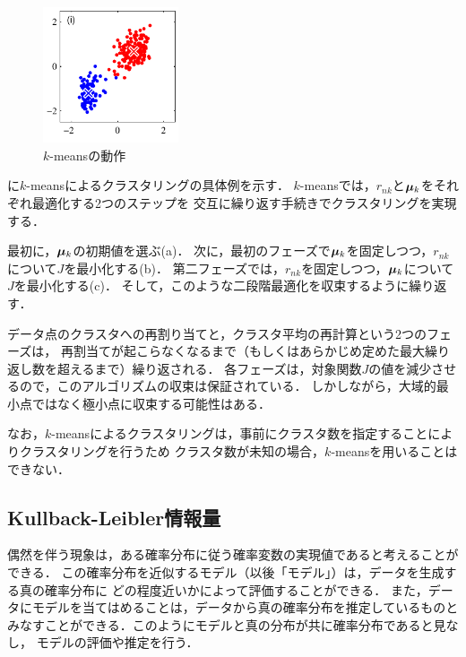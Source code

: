 \begin{figure}[htbp]
\begin{minipage}{0.33\hsize}
\begin{center}
    \end{center}
  \end{minipage}
  \begin{minipage}{0.33\hsize}
    \begin{center}
      \includegraphics[width=40mm]{img/kmeans/Figure91i.pdf}
    \end{center}
  \end{minipage}
  \caption{$k$-meansの動作}
  \label{fig:k-means}
\end{figure}

に$k$-meansによるクラスタリングの具体例を示す．
$k$-meansでは，$r_{nk}$と$\boldsymbol{\mu}_k$をそれぞれ最適化する2つのステップを
交互に繰り返す手続きでクラスタリングを実現する．

最初に，$\boldsymbol{\mu}_k$の初期値を選ぶ(a)．
次に，最初のフェーズで$\boldsymbol{\mu}_k$を固定しつつ，$r_{nk}$について$J$を最小化する(b)．
第二フェーズでは，$r_{nk}$を固定しつつ，$\boldsymbol{\mu}_k$について$J$を最小化する(c)．
そして，このような二段階最適化を収束するように繰り返す．

データ点のクラスタへの再割り当てと，クラスタ平均の再計算という2つのフェーズは，
再割当てが起こらなくなるまで（もしくはあらかじめ定めた最大繰り返し数を超えるまで）繰り返される．
各フェーズは，対象関数$J$の値を減少させるので，このアルゴリズムの収束は保証されている．
しかしながら，大域的最小点ではなく極小点に収束する可能性はある．

なお，$k$-meansによるクラスタリングは，事前にクラスタ数を指定することによりクラスタリングを行うため
クラスタ数が未知の場合，$k$-meansを用いることはできない．

\subsection{Kullback-Leibler情報量}
偶然を伴う現象は，ある確率分布に従う確率変数の実現値であると考えることができる．
この確率分布を近似するモデル（以後「モデル」）は，データを生成する真の確率分布に
どの程度近いかによって評価することができる．
また，データにモデルを当てはめることは，データから真の確率分布を推定しているものと
みなすことができる．このようにモデルと真の分布が共に確率分布であると見なし，
モデルの評価や推定を行う．

